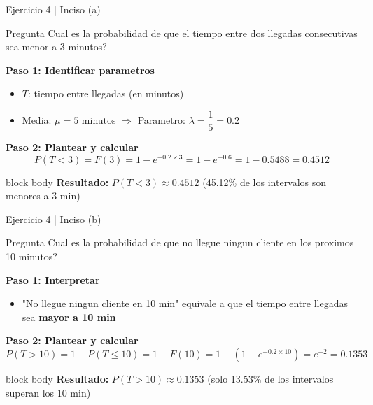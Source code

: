 \documentclass[10pt]{beamer}
\begin{document}
\begin{frame}{Ejercicio 4 | Inciso (a)}
\begin{exampleblock}{Pregunta}
Cual es la probabilidad de que el tiempo entre dos llegadas consecutivas sea menor a 3 minutos?
\end{exampleblock}

\vspace{0.2cm}
\textbf{Paso 1: Identificar parametros}
\begin{itemize}
    \item $T$: tiempo entre llegadas (en minutos)
    \item Media: $\mu = 5$ minutos $\Rightarrow$ Parametro: $\lambda = \dfrac{1}{5} = 0.2$
\end{itemize}

\vspace{0.1cm}
\textbf{Paso 2: Plantear y calcular}
\[
P(T < 3) = F(3) = 1 - e^{-0.2 \times 3} = 1 - e^{-0.6} = 1 - 0.5488 = \boxed{0.4512}
\]

\vspace{0.2cm}
\begin{beamercolorbox}[rounded=true,shadow=true,wd=\linewidth]{block body}
\centering
\textbf{Resultado:} $P(T < 3) \approx 0.4512$ (45.12\% de los intervalos son menores a 3 min)
\end{beamercolorbox}
\end{frame}

\begin{frame}{Ejercicio 4 | Inciso (b)}
\begin{exampleblock}{Pregunta}
Cual es la probabilidad de que no llegue ningun cliente en los proximos 10 minutos?
\end{exampleblock}

\vspace{0.2cm}
\textbf{Paso 1: Interpretar}
\begin{itemize}
    \item "No llegue ningun cliente en 10 min" equivale a que el tiempo entre llegadas sea \textbf{mayor a 10 min}
\end{itemize}

\vspace{0.1cm}
\textbf{Paso 2: Plantear y calcular}
\[
P(T > 10) = 1 - P(T \leq 10) = 1 - F(10) = 1 - \left(1 - e^{-0.2 \times 10}\right) = e^{-2} = \boxed{0.1353}
\]

\vspace{0.2cm}
\begin{beamercolorbox}[rounded=true,shadow=true,wd=\linewidth]{block body}
\centering
\textbf{Resultado:} $P(T > 10) \approx 0.1353$ (solo 13.53\% de los intervalos superan los 10 min)
\end{beamercolorbox}
\end{frame}
\end{document}

